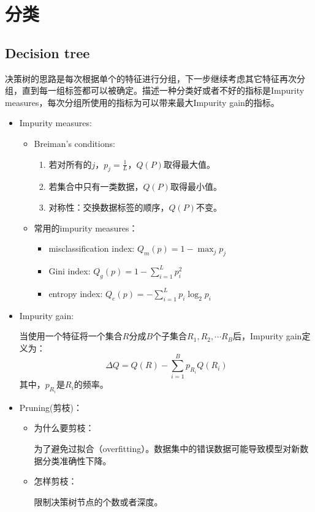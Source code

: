 \documentclass[12pt, a4paper, oneside]{ctexart}
\begin{document}
\section{分类}
\subsection{Decision tree}
决策树的思路是每次根据单个的特征进行分组，下一步继续考虑其它特征再次分组，直到每一组标签都可以被确定。描述一种分类好或者不好的指标是Impurity measures，每次分组所使用的指标为可以带来最大Impurity gain的指标。
\begin{itemize}
    \item Impurity measures:
    \begin{itemize}
        \item Breiman’s conditions:
        \begin{enumerate}
            \item 若对所有的$j$，$p_j=\frac{1}{L}$，$Q(P)$取得最大值。
            \item 若集合中只有一类数据，$Q(P)$取得最小值。
            \item 对称性：交换数据标签的顺序，$Q(P)$不变。
        \end{enumerate}
        \item 常用的impurity measures：
        \begin{itemize}
            \item misclassification index: $Q_m(p)=1-\max_jp_j$
            \item Gini index: $Q_g(p)=1-\sum_{i=1}^Lp_i^2$
            \item entropy index: $Q_e(p)=-\sum_{i=1}^Lp_i\log_2p_i$
        \end{itemize}
    \end{itemize}
    \item Impurity gain:
    
    当使用一个特征将一个集合$R$分成$B$个子集合$R_1,R_2,\cdots R_B$后，Impurity gain定义为：
    $$\Delta Q = Q(R)-\sum_{i=1}^Bp_{R_i}Q(R_i)$$其中，$p_{R_i}$是$R_i$的频率。
    \item Pruning(剪枝)：
    \begin{itemize}
        \item 为什么要剪枝：
        
        为了避免过拟合（overfitting）。数据集中的错误数据可能导致模型对新数据分类准确性下降。

        \item 怎样剪枝：
        
        限制决策树节点的个数或者深度。
    \end{itemize}
\end{itemize}
\end{document}
